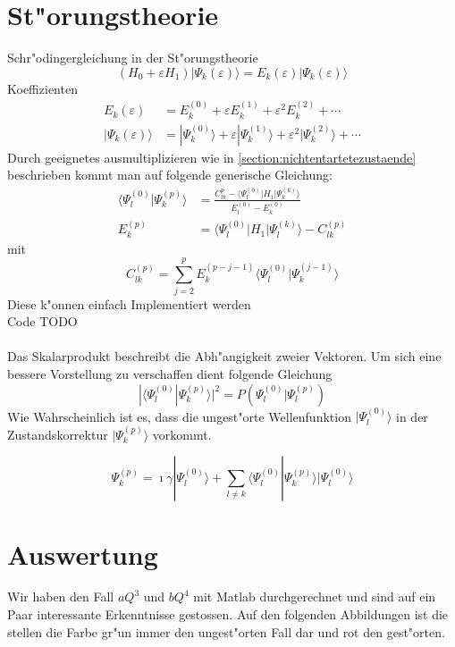 \begin{refsection}
\section{St"orungstheorie}
Schr"odingergleichung in der St"orungstheorie
\[
(H_0+\varepsilon H_1)|\Psi_k(\varepsilon)\rangle
=
E_k(\varepsilon)|\Psi_k(\varepsilon)\rangle
\]
Koeffizienten
\begin{align*}
E_k(\varepsilon)
&=
E_k^{(0)}+\varepsilon E_k^{(1)}+\varepsilon^2 E_k^{(2)}+\dotsb
\\
|\Psi_k(\varepsilon)\rangle
&=
|\Psi_k^{(0)}\rangle+\varepsilon|\Psi_k^{(1)}\rangle+
\varepsilon^2|\Psi_k^{(2)}\rangle+\dotsb
\end{align*}
Durch geeignetes ausmultiplizieren wie in \ref{section:nichtentartetezustaende}  beschrieben kommt man auf folgende generische Gleichung:
\begin{align*}
\langle\Psi_l^{(0)}|\Psi_k^{(p)}\rangle
&=
\frac{C_{lk}^{p}-\langle\Psi_l^{(0)}|H_1|\Psi_k^{(k)}\rangle}
{E_l^{(0)}-E_k^{(0)}}
\\
E_k^{(p)}
&=
\langle\Psi_l^{(0)}|H_1|\Psi_l^{(k)}\rangle-C_{lk}^{(p)}
\end{align*}
mit
\[
C_{lk}^{(p)}
=
\displaystyle\sum_{j=2}^{p} E_k^{(p-j-1)}
\langle\Psi_l^{(0)}|\Psi_k^{(j-1)}\rangle
\]
Diese k"onnen einfach Implementiert werden\\
Code TODO\\
\\
Das Skalarprodukt beschreibt die Abh"angigkeit zweier Vektoren. Um sich eine bessere Vorstellung zu verschaffen dient folgende Gleichung
\[
|\langle\Psi_l^{(0)}|\Psi_k^{(p)}\rangle|^2
=
P(\Psi_l^{(0)}|\Psi_l^{(p)})
\]
Wie Wahrscheinlich ist es, dass die ungest"orte Wellenfunktion $|\Psi_l^{(0)}\rangle$ in der Zustandskorrektur $|\Psi_k^{(p)}\rangle$ vorkommt.

\[
\Psi_k^{(p)}
=
\imath\gamma|\Psi_l^{(0)}\rangle+
\displaystyle\sum_{l\neq k} \langle\Psi_l^{(0)}|\Psi_k^{(p)}\rangle
|\Psi_l^{(0)}\rangle
\]
\section{Auswertung}

Wir haben den Fall $aQ^3$ und $bQ^4$ mit Matlab durchgerechnet und sind auf ein Paar interessante Erkenntnisse gestossen. Auf den folgenden Abbildungen ist die stellen die Farbe gr"un immer den ungest"orten Fall dar und rot den gest"orten.


\end{refsection}
